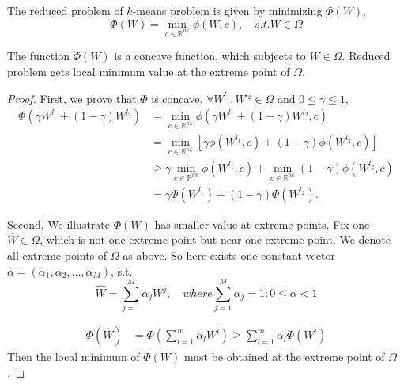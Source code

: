 	\begin{definition}\label{alo: reduce}
	The reduced problem of $k$-means problem is given by minimizing $\Phi(W)$, 
	\begin{equation}
	\Phi (W) = \min_{c \in \mathbb{R}^{nk}} \phi(W, c),  \quad s.t. W \in \Omega
	\end{equation}	
	\end{definition}

	\begin{lemma}
	The function $\Phi(W)$ is a concave function, which subjects to $W\in\Omega$. Reduced problem gets local minimum value at the extreme point of $\Omega$.
	\end{lemma}

	\begin{proof}
	First, we prove that $\Phi$ is concave. $\forall W^{{l}_{1}}, W^{{l}_{2}}\in \Omega$ and $0 \leq \gamma \leq 1$,
	\begin{equation}
	\begin{aligned}
	\Phi(\gamma W^{{l}_{1}}+(1-\gamma)W^{{l}_{2}}) & =\min_{c \in\mathbb{R}^{nk}} \phi(\gamma W^{{l}_{1}}+(1-\gamma) W^{{l}_{2}}, c)\\
	&= \min_{c \in \mathbb{R}^{nk}} [\gamma\phi(W^{{l}_{1}}, c)+(1-\gamma)\phi (W^{{l}_{2}}, c)]\\
	&\geq \gamma \min_{c \in \mathbb{R}^{nk}} \phi(W^{{l}_{1}}, c)+\min_{c \in \mathbb{R}^{nk}}(1-\gamma) \phi(W^{{l}_{2}}, c)\\
	&=\gamma \Phi(W^{{l}_{1}})+(1-\gamma)\Phi(W^{{l}_{2}}).
	\end{aligned}
	\end{equation}
	
	Second, We illustrate $\Phi(W)$ has smaller value at extreme points.
	Fix one $\hat W \in \Omega$, which is not one extreme point but near one extreme point. We denote all extreme points of $\Omega$ as above. So here exists one constant vector $\alpha=(\alpha_{1}, \alpha_{2}, \dots, \alpha_{M})$, s.t.
	\begin{equation}
	{\hat W}= \sum_{j=1}^{M} \alpha_{j} W^{j}, \quad where \sum_{j=1}^{M}\alpha_{j}=1; 0 \leq \alpha <1
	\end{equation}

	\begin{equation}
	\begin{aligned}
	\Phi({\hat W}) &= \Phi(\sum_{l=1}^{m} \alpha_{l} W^{l}) \geq \sum_{l=1}^{m} \alpha_{l}\Phi(W^{l})
	\end{aligned}
	\end{equation}
	Then the local minimum of $\Phi(W)$ must be obtained at the extreme point of $\Omega$.
	\end{proof}
	
